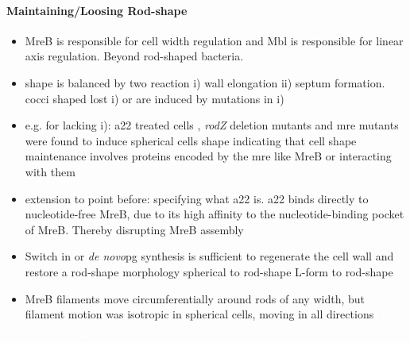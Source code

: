\documentclass{article}
\newcommand{\todo}[1]{\colorbox{WildStrawberry}{\textcolor{white}{#1}}}
\newcommand{\denovo}{\textit{de novo}}
\begin{document}
\paragraph{Maintaining/Loosing Rod-shape}
\begin{itemize}
    \item \cite{Jones2001} MreB is responsible for cell width regulation and Mbl is responsible for linear axis regulation. Beyond rod-shaped bacteria.
    \item \cite{Lleo1990} shape is balanced by two reaction i) wall elongation ii) septum formation. cocci shaped lost i) or are induced by mutations in i)
    \item e.g. for lacking i): \ac{a22} treated cells \cite{IWAI2002}, \textit{rodZ} deletion mutants \cite{Shiomi2008} and \ac{mre} mutants \cite{Wachi1987} were found to induce spherical cells shape indicating that cell shape maintenance involves proteins encoded by the \ac{mre} like MreB or interacting with them
    \item extension to point before: specifying what \ac{a22} is. \cite{Bean2009} \ac{a22} binds directly to nucleotide-free MreB, due to its high affinity to the nucleotide-binding pocket of MreB. Thereby disrupting MreB assembly
    \item Switch in or \denovo \ac{pg} synthesis is sufficient to regenerate the cell wall and restore a rod-shape morphology \cite{Huan2021} spherical to rod-shape  \cite{Kawai2014} L-form to rod-shape
    \item \cite{Garner2021} MreB filaments move circumferentially around rods of any width, but filament motion was isotropic in spherical cells, moving in all directions\todo{why are we citing this?}
\end{itemize}
\end{document}

